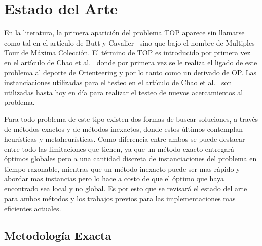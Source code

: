 \section{Estado del Arte}\label{sota}
En la literatura, la primera aparici\'on del problema TOP aparece sin llamarse como tal en el art\'iculo de Butt y Cavalier~\cite{BUTT1994101} sino que bajo el nombre de Multiples Tour de M\'axima Colecci\'on. El t\'ermino de TOP es introducido por primera vez en el art\'iculo de Chao et al.~\cite{TOPresume} donde por primera vez se le realiza el ligado de este problema al deporte de Orienteering y por lo tanto como un derivado de OP. Las instanciaciones utilizadas para el testeo en el art\'iculo de Chao et al.~\cite{TOPresume} son utilizadas hasta hoy en d\'ia para realizar el testeo de nuevos acercamientos al problema.

Para todo problema de este tipo existen dos formas de buscar soluciones, a trav\'es de m\'etodos exactos y de m\'etodos inexactos, donde estos \'ultimos contemplan heur\'isticas y metaheur\'isticas. Como diferencia entre ambos se puede destacar entre todo las limitaciones que tienen, ya que un m\'etodo exacto entregar\'a \'optimos globales pero a una cantidad discreta de instanciaciones del problema en tiempo razonable, mientras que un m\'etodo inexacto puede ser mas r\'apido y abordar mas instancias pero lo hace a costo de que el \'optimo que haya encontrado sea local y no global. Es por esto que se revisar\'a el estado del arte para ambos m\'etodos y los trabajos previos para las implementaciones mas eficientes actuales.

\subsection{Metodolog\'ia Exacta}

